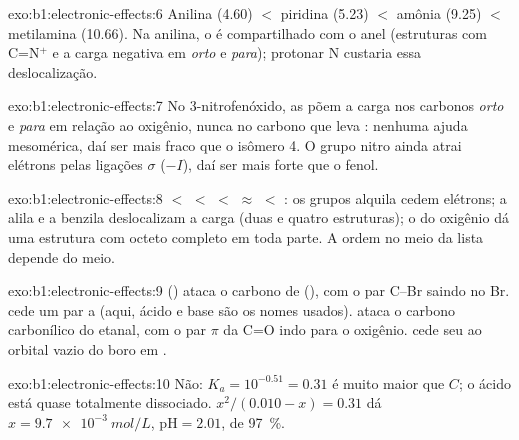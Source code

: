 \begin{solution}{exo:b1:electronic-effects:6}
Anilina (4.60) $<$ piridina (5.23) $<$ amônia (9.25) $<$ metilamina
(10.66). Na anilina, o  é compartilhado com o anel
(estruturas com C=N$^+$ e a carga negativa em \textit{orto} e
\textit{para}); protonar N custaria essa deslocalização.
\end{solution}

\begin{solution}{exo:b1:electronic-effects:7}
No 3-nitrofenóxido, as  põem a carga nos
carbonos \textit{orto} e \textit{para} em relação ao oxigênio, nunca no
carbono que leva : nenhuma ajuda mesomérica, daí ser mais fraco
que o isômero 4. O grupo nitro ainda atrai elétrons pelas ligações
$\sigma$ ($-I$), daí ser mais forte que o fenol.
\end{solution}

\begin{solution}{exo:b1:electronic-effects:8}
 $<$  $<$  $<$ 
$\approx$  $<$ : os grupos alquila cedem
elétrons; a alila e a benzila deslocalizam a carga (duas e quatro
estruturas); o  do oxigênio dá uma estrutura com octeto
completo em toda parte. A ordem no meio da lista depende do meio.
\end{solution}

\begin{solution}{exo:b1:electronic-effects:9}
 () ataca o carbono de  (), com o
par C--Br saindo no Br.  cede um par a  (aqui, ácido e
base são os nomes usados).  ataca o carbono carbonílico do
etanal, com o par $\pi$ da C=O indo para o oxigênio.  cede seu
 ao orbital vazio do boro em .
\end{solution}

\begin{solution}{exo:b1:electronic-effects:10}
Não: $K_a = 10^{-0.51} = 0.31$ é muito maior que $C$; o ácido está quase
totalmente dissociado. $x^2/(0.010 - x) = 0.31$ dá $x = \qty{9.7e-3}{mol/L}$,
$\mathrm{pH} = 2.01$,  de \qty{97}{\percent}.
\end{solution}

